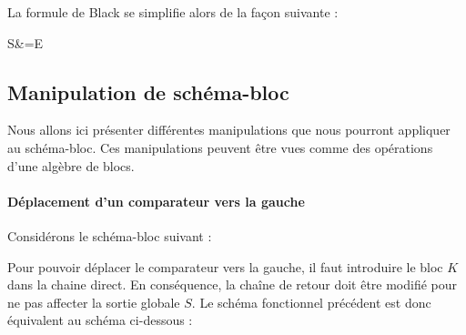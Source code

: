 \begin{center}
\end{center}

La formule de Black se simplifie alors de la façon suivante :
\begin{bequation}
    S&=E
\end{bequation}

\newpage

\subsection{Manipulation de schéma-bloc}
Nous allons ici présenter différentes manipulations que nous
pourront appliquer au schéma-bloc. Ces manipulations peuvent
être vues comme des opérations d'une algèbre de blocs.

\paragraph{Déplacement d'un comparateur vers la gauche}

Considérons le schéma-bloc suivant :
\begin{center}
\end{center}

Pour pouvoir déplacer le comparateur vers la gauche, 
il faut introduire le bloc $K$ dans la chaine direct.
En conséquence, la chaîne de retour doit être modifié  pour ne pas affecter la sortie globale $S$.
Le schéma fonctionnel précédent est donc équivalent au schéma ci-dessous :

